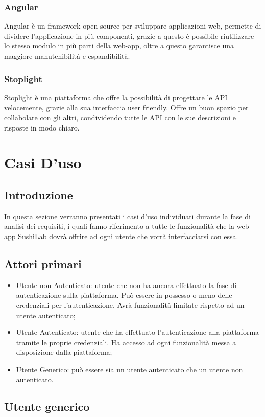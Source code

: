 \subsubsection{Angular}
Angular è un framework open source per sviluppare applicazioni web, permette di dividere l'applicazione in più componenti, grazie a questo è possibile riutilizzare lo stesso modulo in più parti della web-app, oltre a questo garantisce una maggiore manutenibilità e espandibilità.
\subsubsection{Stoplight}
Stoplight è una piattaforma che offre la possibilità di progettare le API velocemente, grazie alla sua interfaccia user friendly\gl{}. Offre un buon spazio per collabolare con gli altri, condividendo tutte le API con le sue descrizioni e risposte in modo chiaro.
\section{Casi D'uso}
\subsection{Introduzione }
In questa sezione verranno presentati i casi d'uso individuati durante la fase di analisi dei requisiti, i quali fanno riferimento a tutte le funzionalità che la web-app SushiLab dovrà offrire ad ogni utente che vorrà interfacciarsi con essa.
\subsection{Attori primari}
\begin{itemize}
    \item Utente non Autenticato: utente che non ha ancora effettuato la fase di autenticazione sulla piattaforma. Può essere in possesso o meno delle credenziali per l'autenticazione. Avrà funzionalità limitate rispetto ad un utente autenticato;
    \item Utente Autenticato: utente che ha effettuato l'autenticazione alla piattaforma tramite le proprie credenziali. Ha accesso ad ogni funzionalità messa a disposizione dalla piattaforma;
    \item  Utente Generico: può essere sia un utente autenticato che un utente non autenticato.
\end{itemize}
\subsection{Utente generico}
